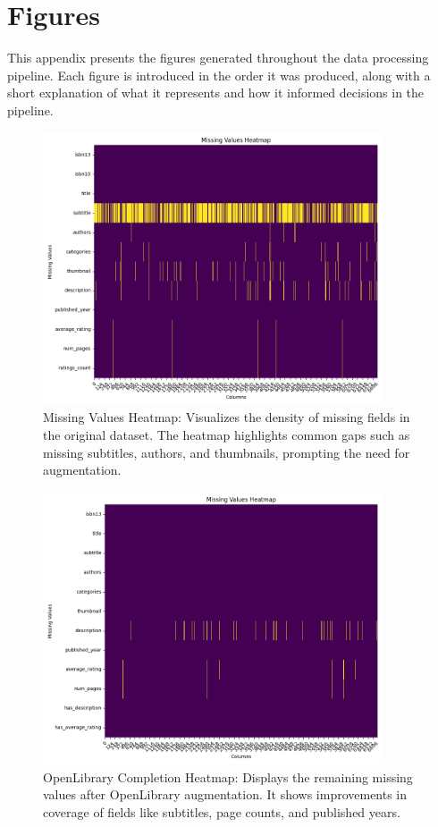 \chapter{Figures}
\label{appendix:figures}

This appendix presents the figures generated throughout the data processing pipeline. Each figure is introduced in the order it was produced, along with a short explanation of what it represents and how it informed decisions in the pipeline.

\begin{figure}[H]
    \centering
    \includegraphics[width=0.9\textwidth]{figures/missing_values_heatmap.png}
    \caption{Missing Values Heatmap: Visualizes the density of missing fields in the original dataset. The heatmap highlights common gaps such as missing subtitles, authors, and thumbnails, prompting the need for augmentation.}
\end{figure}

\begin{figure}[H]
    \centering
    \includegraphics[width=0.9\textwidth]{figures/openlib_values_heatmap.png}
    \caption{OpenLibrary Completion Heatmap: Displays the remaining missing values after OpenLibrary augmentation. It shows improvements in coverage of fields like subtitles, page counts, and published years.}
\end{figure}

